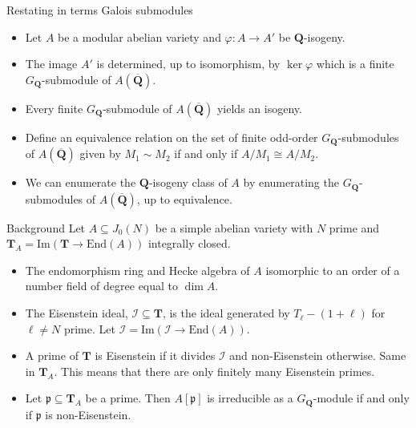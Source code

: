 \documentclass{beamer}
\newcommand{\QQ}{\mathbf{Q}}
\newcommand{\QQbar}{\overline{\mathbf{Q}}}
\newcommand{\TT}{\mathbf{T}}
\newcommand{\I}{\mathcal{I}}
\renewcommand{\Im}{\mathrm{Im}}
\newcommand{\End}{\mathrm{End}}
\newcommand{\p}{\mathfrak{p}}
\begin{document}
\begin{frame}{Restating in terms Galois submodules}
    \begin{itemize}
        \item
            Let $A$ be a modular abelian variety and $\varphi:A\to A'$ be
            $\QQ$-isogeny.
        \item
            The image $A'$ is determined, up to isomorphism, by $\ker\varphi$
            which is a finite $G_\QQ$-submodule of $A(\QQbar)$.
        \item
            Every finite $G_\QQ$-submodule of $A(\QQbar)$ yields an isogeny.
        \item
            Define an equivalence relation on the set of finite odd-order
            $G_\QQ$-submodules of $A(\QQbar)$ given by $M_1\sim M_2$ if and only if
            $A/M_1\cong A/M_2$.
        \item
            We can enumerate the $\QQ$-isogeny class of $A$ by enumerating the
            $G_\QQ$-submodules of $A(\QQbar)$, up to equivalence.
    \end{itemize}
\end{frame}

\begin{frame}{Background}
    Let $A\subseteq J_0(N)$ be a simple abelian variety with $N$ prime and
    $\TT_A = \Im(\TT\to \End(A))$ integrally closed.
    \begin{itemize}
        \item
            The endomorphism ring and Hecke algebra of $A$ isomorphic to an
            order of a number field of degree equal to $\dim A$.
        \item
            The Eisenstein ideal, $\mathcal{I}\subseteq \TT$, is the ideal
            generated by $T_\ell-(1+\ell)$ for $\ell\neq N$ prime. Let
            $\I=\Im(\I\to \End(A))$.
        \item
            A prime of $\TT$ is Eisenstein if it divides $\I$ and
            non-Eisenstein otherwise. Same in $\TT_A$. This means that there
            are only finitely many Eisenstein primes.
        \item
            Let $\p\subseteq \TT_A$ be a prime. Then $A[\p]$ is irreducible as
            a $G_\QQ$-module if and only if $\p$ is non-Eisenstein.
    \end{itemize}
\end{frame}
\end{document}
